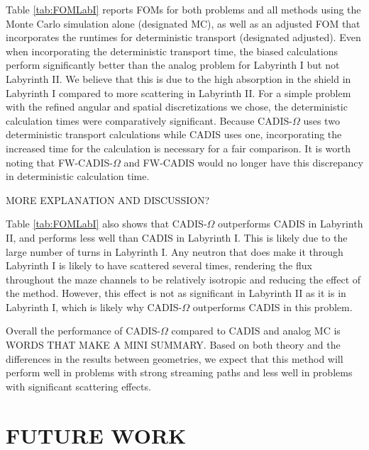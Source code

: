 \documentclass[12pt]{article}
\begin{document}
Table \ref{tab:FOMLabI} reports FOMs for both problems and all methods using the Monte Carlo simulation alone (designated MC), as well as an adjusted FOM that incorporates the runtimes for deterministic transport (designated adjusted). 
Even when incorporating the deterministic transport time, the biased calculations perform significantly better than the analog problem for Labyrinth I but not Labyrinth II. 
We believe that this is due to the high absorption in the shield in Labyrinth I compared to more scattering in Labyrinth II. 
For a simple problem with the refined angular and spatial discretizations we chose, the deterministic calculation times were comparatively significant.
Because CADIS-$\Omega$ uses two deterministic transport calculations while CADIS uses one, incorporating the increased time for the calculation is necessary for a fair comparison.
It is worth noting that FW-CADIS-$\Omega$ and FW-CADIS would no longer have this discrepancy in deterministic calculation time.
 
MORE EXPLANATION AND DISCUSSION?

Table \ref{tab:FOMLabI} also shows that CADIS-$\Omega$ outperforms CADIS in Labyrinth II, and performs less well than CADIS in Labyrinth I. This is likely due to the large number of turns in Labyrinth I. 
Any neutron that does make it through Labyrinth I is likely to have scattered several times, rendering the flux throughout the maze channels to be relatively isotropic and reducing the effect of the method. However, this effect is not as significant in Labyrinth II as it is in Labyrinth I, which is likely why CADIS-$\Omega$ outperforms CADIS in this problem. 

Overall the performance of CADIS-$\Omega$ compared to CADIS and analog MC is WORDS THAT MAKE A MINI SUMMARY. 
Based on both theory and the differences in the results between geometries, we expect that this method will perform well in problems with strong streaming paths and less well in problems with significant scattering effects. 
 


%
\section{FUTURE WORK} 
\label{sect::future}
 
\end{document}
